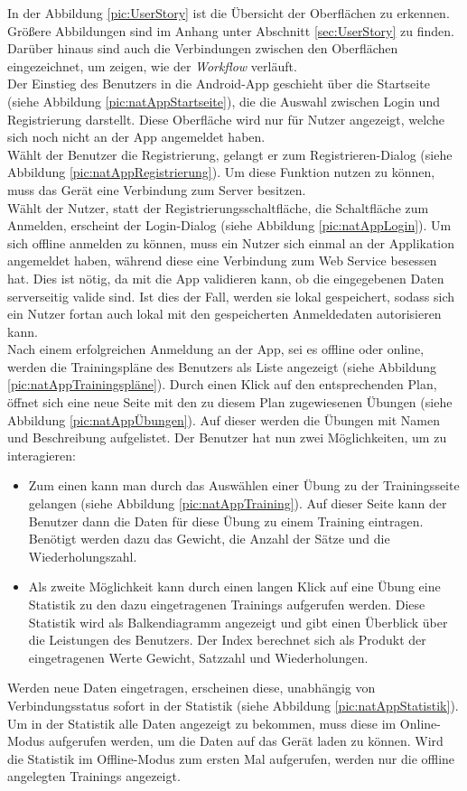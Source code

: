 In der Abbildung \ref{pic:UserStory} ist die Übersicht der Oberflächen zu erkennen. Größere Abbildungen sind im Anhang unter Abschnitt \ref{sec:UserStory} zu finden. Darüber hinaus sind auch die Verbindungen zwischen den Oberflächen eingezeichnet, um zeigen, wie der \textit{Workflow} verläuft.\\
Der Einstieg des Benutzers in die \gls{Android}-\gls{App} geschieht über die Startseite (siehe Abbildung \ref{pic:natAppStartseite}), die die Auswahl zwischen Login und Registrierung darstellt. Diese Oberfläche wird nur für Nutzer angezeigt, welche sich noch nicht an der \gls{App} angemeldet haben. \\
Wählt der Benutzer die Registrierung, gelangt er zum Registrieren-Dialog (siehe Abbildung \ref{pic:natAppRegistrierung}). Um diese Funktion nutzen zu können, muss das Gerät eine Verbindung zum Server besitzen. \\
Wählt der Nutzer, statt der Registrierungsschaltfläche, die Schaltfläche zum Anmelden, erscheint der Login-Dialog (siehe Abbildung \ref{pic:natAppLogin}). Um sich offline anmelden zu können, muss ein Nutzer sich einmal an der Applikation angemeldet haben, während diese eine Verbindung zum Web Service besessen hat. Dies ist nötig, da mit die \gls{App} validieren kann, ob die eingegebenen Daten serverseitig valide sind. Ist dies der Fall, werden sie lokal gespeichert, sodass sich ein Nutzer fortan auch lokal mit den gespeicherten Anmeldedaten autorisieren kann.\\
Nach einem erfolgreichen Anmeldung an der \gls{App}, sei es offline oder online, werden die Trainingspläne des Benutzers als Liste angezeigt (siehe Abbildung \ref{pic:natAppTrainingspläne}). Durch einen Klick auf den entsprechenden Plan, öffnet sich eine neue Seite mit den zu diesem Plan zugewiesenen Übungen (siehe Abbildung \ref{pic:natAppÜbungen}). Auf dieser werden die Übungen mit Namen und Beschreibung aufgelistet. Der Benutzer hat nun zwei Möglichkeiten, um zu interagieren: 
\begin{itemize}
\item Zum einen kann man durch das Auswählen einer Übung zu der Trainingsseite gelangen (siehe Abbildung \ref{pic:natAppTraining}). Auf dieser Seite kann der Benutzer dann die Daten für diese Übung zu einem Training eintragen. Benötigt werden dazu das Gewicht, die Anzahl der Sätze und die Wiederholungszahl.
\item Als zweite Möglichkeit kann durch einen langen Klick auf eine Übung eine Statistik zu den dazu eingetragenen Trainings aufgerufen werden. Diese Statistik wird als Balkendiagramm angezeigt und gibt einen Überblick über die Leistungen des Benutzers. Der Index berechnet sich als Produkt der eingetragenen Werte Gewicht, Satzzahl und Wiederholungen.
\end{itemize}
Werden neue Daten eingetragen, erscheinen diese, unabhängig von Verbindungsstatus sofort in der Statistik (siehe Abbildung \ref{pic:natAppStatistik}). Um in der Statistik alle Daten angezeigt zu bekommen, muss diese im Online-Modus aufgerufen werden, um die Daten auf das Gerät laden zu können. Wird die Statistik im Offline-Modus zum ersten Mal aufgerufen, werden nur die offline angelegten Trainings angezeigt.